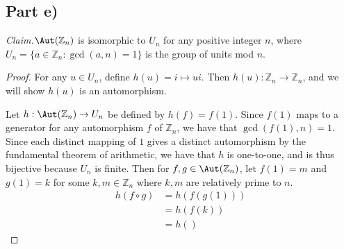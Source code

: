 \documentclass{abrice}
\newcommand{\Z}{\mathbb{Z}}
\newcommand{\Claim}{\emph{Claim.}\xspace}%
\begin{document}
\subsection{Part e)}

\Claim $\Aut(\Z_n)$ is isomorphic to $U_n$ for any positive integer $n$, where
$U_n = \{ a \in \Z_n : \gcd(a,n) = 1\}$ is the group of units mod $n$.

\begin{proof}
  For any $u \in U_n$, define $h(u) = i \mapsto ui$. Then $h(u) : \Z_n \to
  \Z_n$, and we will show $h(u)$ is an automorphism.

  Let $h : \Aut(\Z_n) \to U_n$ be defined by $h(f) = f(1)$. Since $f(1)$ maps to
  a generator for any automorphism $f$ of $\Z_n$, we have that $\gcd(f(1),n) =
  1$. Since each distinct mapping of $1$ gives a distinct automorphism by the
  fundamental theorem of arithmetic, we have that $h$ is one-to-one, and is thus
  bijective because $U_n$ is finite. Then for $f,g \in \Aut(\Z_n)$, let $f(1) =
  m$ and $g(1) = k$ for some $k,m \in \Z_n$ where $k,m$ are relatively prime to
  $n$.
  \begin{align*}
    h(f \circ g)
    &= h(f(g(1))) \\
    &= h(f(k)) \\
    &= h()
  \end{align*}
\end{proof}
\end{document}
